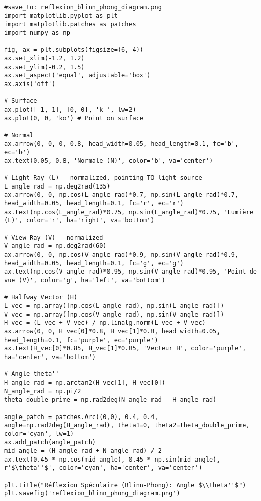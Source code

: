 \documentclass{article}
\begin{document}
\begin{verbatim}
#save_to: reflexion_blinn_phong_diagram.png
import matplotlib.pyplot as plt
import matplotlib.patches as patches
import numpy as np

fig, ax = plt.subplots(figsize=(6, 4))
ax.set_xlim(-1.2, 1.2)
ax.set_ylim(-0.2, 1.5)
ax.set_aspect('equal', adjustable='box')
ax.axis('off')

# Surface
ax.plot([-1, 1], [0, 0], 'k-', lw=2)
ax.plot(0, 0, 'ko') # Point on surface

# Normal
ax.arrow(0, 0, 0, 0.8, head_width=0.05, head_length=0.1, fc='b', ec='b')
ax.text(0.05, 0.8, 'Normale (N)', color='b', va='center')

# Light Ray (L) - normalized, pointing TO light source
L_angle_rad = np.deg2rad(135)
ax.arrow(0, 0, np.cos(L_angle_rad)*0.7, np.sin(L_angle_rad)*0.7, head_width=0.05, head_length=0.1, fc='r', ec='r')
ax.text(np.cos(L_angle_rad)*0.75, np.sin(L_angle_rad)*0.75, 'Lumière (L)', color='r', ha='right', va='bottom')

# View Ray (V) - normalized
V_angle_rad = np.deg2rad(60)
ax.arrow(0, 0, np.cos(V_angle_rad)*0.9, np.sin(V_angle_rad)*0.9, head_width=0.05, head_length=0.1, fc='g', ec='g')
ax.text(np.cos(V_angle_rad)*0.95, np.sin(V_angle_rad)*0.95, 'Point de vue (V)', color='g', ha='left', va='bottom')

# Halfway Vector (H)
L_vec = np.array([np.cos(L_angle_rad), np.sin(L_angle_rad)])
V_vec = np.array([np.cos(V_angle_rad), np.sin(V_angle_rad)])
H_vec = (L_vec + V_vec) / np.linalg.norm(L_vec + V_vec)
ax.arrow(0, 0, H_vec[0]*0.8, H_vec[1]*0.8, head_width=0.05, head_length=0.1, fc='purple', ec='purple')
ax.text(H_vec[0]*0.85, H_vec[1]*0.85, 'Vecteur H', color='purple', ha='center', va='bottom')

# Angle theta''
H_angle_rad = np.arctan2(H_vec[1], H_vec[0])
N_angle_rad = np.pi/2
theta_double_prime = np.rad2deg(N_angle_rad - H_angle_rad)

angle_patch = patches.Arc((0,0), 0.4, 0.4, angle=np.rad2deg(H_angle_rad), theta1=0, theta2=theta_double_prime, color='cyan', lw=1)
ax.add_patch(angle_patch)
mid_angle = (H_angle_rad + N_angle_rad) / 2
ax.text(0.45 * np.cos(mid_angle), 0.45 * np.sin(mid_angle), r'$\theta''$', color='cyan', ha='center', va='center')

plt.title("Réflexion Spéculaire (Blinn-Phong): Angle $\\theta''$")
plt.savefig('reflexion_blinn_phong_diagram.png')
\end{verbatim}
\end{document}

